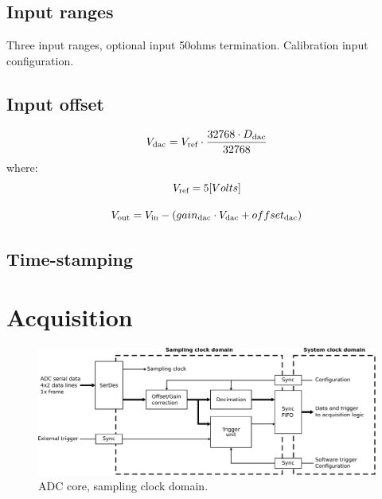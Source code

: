 \documentclass[11pt,a4paper]{article}
\newcommand{\subscript}[1]{\ensuremath{_{\textnormal{\scriptsize{#1}}}}}
\begin{document}
\subsection{Input ranges}
Three input ranges, optional input 50ohms termination.
Calibration input configuration.


\subsection{Input offset}

\begin{equation}\label{dac_digital2volts}
V\subscript{dac} = V\subscript{ref} \cdot \frac{32768 \cdot D\subscript{dac}}{32768} \\
\end{equation}
where:
\begin{equation}
V\subscript{ref} = 5 [Volts]
\end{equation}


\begin{equation}\label{in_dac_offset}
V\subscript{out} = V\subscript{in} - (gain\subscript{dac} \cdot V\subscript{dac} + offset\subscript{dac})
\end{equation}


\subsection{Time-stamping}



\section{Acquisition}

\begin{figure}[h!]
  \includegraphics[width=\textwidth]{figures/adc_core_fs_clk.pdf}
  \caption{ADC core, sampling clock domain.}
  \label{fig:adc_core_fs_clk}
\end{figure}
\end{document}
